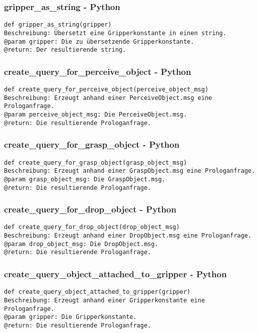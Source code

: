 \documentclass{suturo}
\begin{document}
\subsubsection{gripper\_as\_string - Python}
\begin{verbatim}
def gripper_as_string(gripper)
Beschreibung: Übersetzt eine Gripperkonstante in einen string.
@param gripper: Die zu übersetzende Gripperkonstante.
@return: Der resultierende string.
\end{verbatim}

\subsubsection{create\_query\_for\_perceive\_object - Python}
\begin{verbatim}
def create_query_for_perceive_object(perceive_object_msg)
Beschreibung: Erzeugt anhand einer PerceiveObject.msg eine Prologanfrage.
@param perceive_object_msg: Die PerceiveObject.msg.
@return: Die resultierende Prologanfrage.
\end{verbatim}

\subsubsection{create\_query\_for\_grasp\_object - Python}
\begin{verbatim}
def create_query_for_grasp_object(grasp_object_msg)
Beschreibung: Erzeugt anhand einer GraspObject.msg eine Prologanfrage.
@param grasp_object_msg: Die GraspObject.msg.
@return: Die resultierende Prologanfrage.
\end{verbatim}

\subsubsection{create\_query\_for\_drop\_object - Python}
\begin{verbatim}
def create_query_for_drop_object(drop_object_msg)
Beschreibung: Erzeugt anhand einer DropObject.msg eine Prologanfrage.
@param drop_object_msg: Die DropObject.msg.
@return: Die resultierende Prologanfrage.
\end{verbatim}

\subsubsection{create\_query\_object\_attached\_to\_gripper - Python}
\begin{verbatim}
def create_query_object_attached_to_gripper(gripper)
Beschreibung: Erzeugt anhand einer Gripperkonstante eine Prologanfrage.
@param gripper: Die Gripperkonstante.
@return: Die resultierende Prologanfrage.
\end{verbatim}
\end{document}
